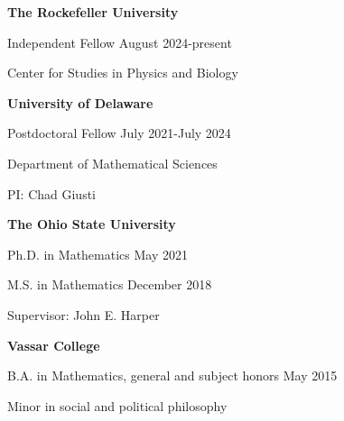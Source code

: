 \documentclass[10pt,letterpaper]{article}
\renewenvironment{itemize}{
  \begin{list}{}{
    \setlength{\leftmargin}{1.5em}
    \setlength{\itemsep}{0.25em}
    \setlength{\parskip}{0pt}
    \setlength{\parsep}{0.25em}
  }
}{
  \end{list}
}
\begin{document}
\begin{itemize}

\item {\bf The Rockefeller University}
\begin{itemize}
\item Independent Fellow \hfill August 2024-present

\vspace{-1ex}

\item Center for Studies in Physics and Biology
\end{itemize}





\item {\bf University of Delaware}
\begin{itemize}
\item Postdoctoral Fellow \hfill July 2021-July 2024

\vspace{-1ex}

\item Department of Mathematical Sciences

\vspace{-1ex}

\item PI: Chad Giusti
\end{itemize}

\item {\bf The Ohio State University}
	
	\begin{itemize}
	\item Ph.D. in Mathematics \hfill May 2021
	
	\vspace{-1ex}
	
	\item M.S. in Mathematics \hfill December 2018
	
	\vspace{-1ex}
		
	\item Supervisor: John E. Harper
	\end{itemize}

 
\item {\bf Vassar College}
  
  \begin{itemize}
	\item B.A. in Mathematics, general and subject honors \hfill May 2015
	
	\vspace{-1ex}
	
  	\item Minor in social and political philosophy 
  \end{itemize}

\end{itemize}
\end{document}

